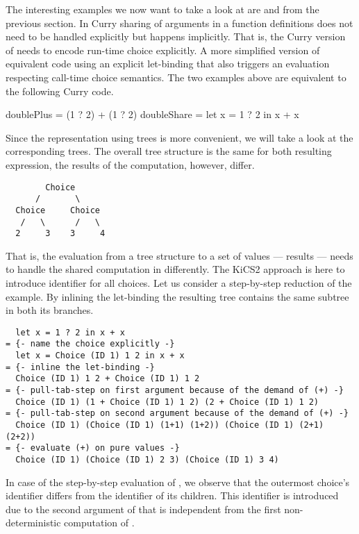 The interesting examples we now want to take a look at are  and  from the
previous section.
In Curry sharing of arguments in a function definitions does not need to be handled explicitly but happens implicitly.
That is, the Curry version of  needs to encode run-time choice explicitly.
A more simplified version of equivalent code using an explicit let-binding that also triggers an evaluation respecting call-time
choice semantics.
The two examples above are equivalent to the following Curry code.

\begin{curry}
doublePlus = (1 ? 2) + (1 ? 2)
doubleShare = let x = 1 ? 2 in x + x
\end{curry}

Since the representation using trees is more convenient, we will take a look at the corresponding trees.
The overall tree structure is the same for both resulting expression, the results of the computation, however, differ.

\begin{verbatim}
        Choice
      /       \
  Choice     Choice
   /   \      /   \
  2     3    3     4
\end{verbatim}

That is, the evaluation from a tree structure to a set of values --- results --- needs to handle the shared computation in  differently.
The KiCS2 approach is here to introduce identifier for all choices.
Let us consider a step-by-step reduction of the \cyinl{doubleShare} example.
By inlining the let-binding the resulting tree contains the same subtree in both its branches.

\begin{verbatim}
  let x = 1 ? 2 in x + x
= {- name the choice explicitly -}
  let x = Choice (ID 1) 1 2 in x + x
= {- inline the let-binding -}
  Choice (ID 1) 1 2 + Choice (ID 1) 1 2
= {- pull-tab-step on first argument because of the demand of (+) -}
  Choice (ID 1) (1 + Choice (ID 1) 1 2) (2 + Choice (ID 1) 1 2)
= {- pull-tab-step on second argument because of the demand of (+) -}
  Choice (ID 1) (Choice (ID 1) (1+1) (1+2)) (Choice (ID 1) (2+1) (2+2))
= {- evaluate (+) on pure values -}
  Choice (ID 1) (Choice (ID 1) 2 3) (Choice (ID 1) 3 4)
\end{verbatim}

In case of the step-by-step evaluation of , we observe that the outermost choice's identifier differs from the identifier of its children.
This identifier is introduced due to the second argument of \cyinl{(+)} that is independent from the first non-deterministic computation of .

